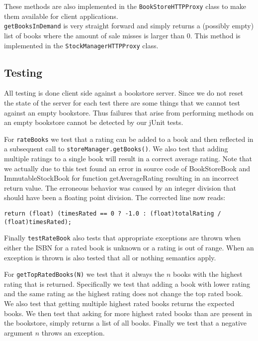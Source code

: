 \documentclass[11pt]{article}
\begin{document}
These methods are also implemented in the \texttt{BookStoreHTTPProxy} class to
make them available for client applications.\\

\texttt{getBooksInDemand} is very straight forward and simply returns a
(possibly empty) list of books where the amount of sale misses is larger than
0. This method is implemented in the \texttt{StockManagerHTTPProxy} class.

\subsection*{Testing}

All testing is done client side against a bookstore server. Since we do not reset the state of the server for each test there are some things that we cannot test against an empty bookstore. Thus failures that arise from performing methods on an empty bookstore cannot be detected by our jUnit tests.

For \texttt{rateBooks} we test that a rating can be added to a book and then reflected in a subsequent call to \texttt{storeManager.getBooks()}. We also test that adding multiple ratings to a single book will result in a correct average rating. Note that we actually due to this test found an error in source code of BookStoreBook and ImmutableStockBook for function getAverageRating resulting in an incorrect return value. The erroneous behavior was caused by an integer division that should have been a floating point division. The corrected line now reads:

\begin{center}
\texttt{return (float) (timesRated == 0 ? -1.0 : (float)totalRating / (float)timesRated);}
\end{center}

Finally \texttt{testRateBook} also tests that appropriate exceptions are thrown when either the ISBN for a rated book is unknown or a rating is out of range. When an exception is thrown is also tested that all or nothing semantics apply.  

For \texttt{getTopRatedBooks(N)} we test that it always the $n$ books with the highest rating that is returned. Specifically we test that adding a book with lower rating and the same rating as the highest rating does not change the top rated book. We also test that getting multiple highest rated books returns the expected books. We then test that asking for more highest rated books than are present in the bookstore, simply returns a list of all books. Finally we test that a negative argument $n$ throws an exception.
\end{document}
